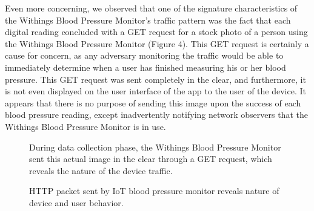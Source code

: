 Even more concerning, we observed that one of the signature characteristics of
the Withings Blood Pressure Monitor's traffic pattern was the fact that each
digital reading concluded with a GET request for a stock photo of a person
using the Withings Blood Pressure Monitor (Figure 4). This GET request is
certainly a cause for concern, as any adversary monitoring the traffic would
be able to immediately determine when a user has finished measuring his or her
blood pressure. This GET request was sent completely in the clear, and
furthermore, it is not even displayed on the user interface of the app to the
user of the device. It appears that there is no purpose of sending this image
upon the success of each blood pressure reading, except inadvertently
notifying network observers that the Withings Blood Pressure Monitor is in
use.

\begin{figure}[t]
  \centering
     \caption{During data collection phase, the Withings Blood Pressure Monitor sent this actual image in the clear through a GET request, which reveals the nature of the device traffic.}
     \label{fig:bp-image}
\end{figure}

\begin{figure}[t]
  \centering
  \caption{HTTP packet sent by IoT blood pressure monitor reveals nature of device and user behavior.}
  \label{fig:bp-packet}
\end{figure}

